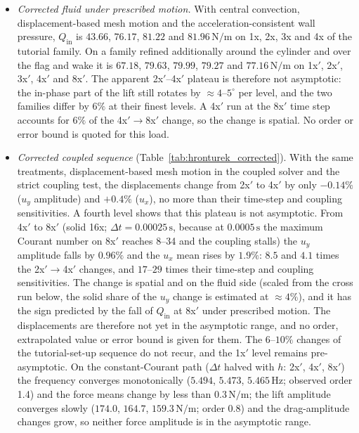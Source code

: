 \begin{itemize}
	\item \emph{Corrected fluid under prescribed motion.} With central convection, displacement-based mesh motion and the acceleration-consistent wall pressure, $Q_\mathrm{in}$ is $43.66$, $76.17$, $81.22$ and $81.96\,\mathrm{N/m}$ on 1x, 2x, 3x and 4x of the tutorial family. On a family refined additionally around the cylinder and over the flag and wake it is $67.18$, $79.63$, $79.99$, $79.27$ and $77.16\,\mathrm{N/m}$ on 1x$'$, 2x$'$, 3x$'$, 4x$'$ and 8x$'$. The apparent 2x$'$--4x$'$ plateau is therefore not asymptotic: the in-phase part of the lift still rotates by $\approx4$--$5^\circ$ per level, and the two families differ by $6\%$ at their finest levels. A 4x$'$ run at the 8x$'$ time step accounts for $6\%$ of the 4x$'\to$8x$'$ change, so the change is spatial. No order or error bound is quoted for this load.
	\item \emph{Corrected coupled sequence} (Table~\ref{tab:hronturek_corrected}). With the same treatments, displacement-based mesh motion in the coupled solver and the strict coupling test, the displacements change from 2x$'$ to 4x$'$ by only $-0.14\%$ ($u_y$ amplitude) and $+0.4\%$ ($u_x$), no more than their time-step and coupling sensitivities. A fourth level shows that this plateau is not asymptotic. From 4x$'$ to 8x$'$ (solid 16x; $\Delta t = 0.00025\,\mathrm{s}$, because at $0.0005\,\mathrm{s}$ the maximum Courant number on 8x$'$ reaches 8--34 and the coupling stalls) the $u_y$ amplitude falls by $0.96\%$ and the $u_x$ mean rises by $1.9\%$: $8.5$ and $4.1$ times the 2x$'\to$4x$'$ changes, and $17$--$29$ times their time-step and coupling sensitivities. The change is spatial and on the fluid side (scaled from the cross run below, the solid share of the $u_y$ change is estimated at $\approx4\%$), and it has the sign predicted by the fall of $Q_\mathrm{in}$ at 8x$'$ under prescribed motion. The displacements are therefore not yet in the asymptotic range, and no order, extrapolated value or error bound is given for them. The $6$--$10\%$ changes of the tutorial-set-up sequence do not recur, and the 1x$'$ level remains pre-asymptotic. On the constant-Courant path ($\Delta t$ halved with $h$: 2x$'$, 4x$'$, 8x$'$) the frequency converges monotonically ($5.494$, $5.473$, $5.465\,\mathrm{Hz}$; observed order 1.4) and the force means change by less than $0.3\,\mathrm{N/m}$; the lift amplitude converges slowly ($174.0$, $164.7$, $159.3\,\mathrm{N/m}$; order 0.8) and the drag-amplitude changes grow, so neither force amplitude is in the asymptotic range.

\end{itemize}
